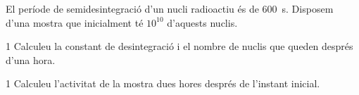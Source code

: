 El període de semidesintegració d'un nucli radioactiu és de 600~s. Disposem d'una mostra que inicialment té $10^{10}$ d'aquests nuclis.

\begin{apartat}{1}
Calculeu la constant de desintegració i el nombre de nuclis que queden després d'una hora.
\end{apartat}

\begin{apartat}{1}
Calculeu l'activitat de la mostra dues hores després de l'instant inicial.
\end{apartat}

